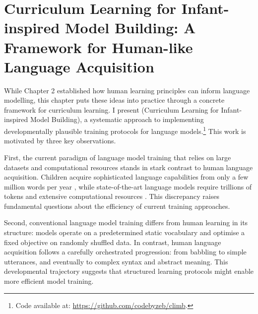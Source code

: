 \chapter{Curriculum Learning for Infant-inspired Model Building: A Framework for Human-like Language Acquisition}
\label{chapter:CLIMB}





While Chapter 2 established how human learning principles can inform language modelling, this chapter puts these ideas into practice through a concrete framework for curriculum learning. I present \climb (Curriculum Learning for Infant-inspired Model Building), a systematic approach to implementing developmentally plausible training protocols for language models.\footnote{Code available at: \url{https://github.com/codebyzeb/climb}.} This work is motivated by three key observations.

First, the current paradigm of language model training that relies on large datasets and computational resources stands in stark contrast to human language acquisition. Children acquire sophisticated language capabilities from only a few million words per year \citep{gilkerson2017mapping}, while state-of-the-art language models require trillions of tokens and extensive computational resources \citep{zhang2021need, zhao2023llmsurvey}. This discrepancy raises fundamental questions about the efficiency of current training approaches.

Second, conventional language model training differs from human learning in its structure: models operate on a predetermined static vocabulary and optimise a fixed objective on randomly shuffled data. In contrast, human language acquisition follows a carefully orchestrated progression: from babbling to simple utterances, and eventually to complex syntax and abstract meaning. This developmental trajectory suggests that structured learning protocols might enable more efficient model training.

